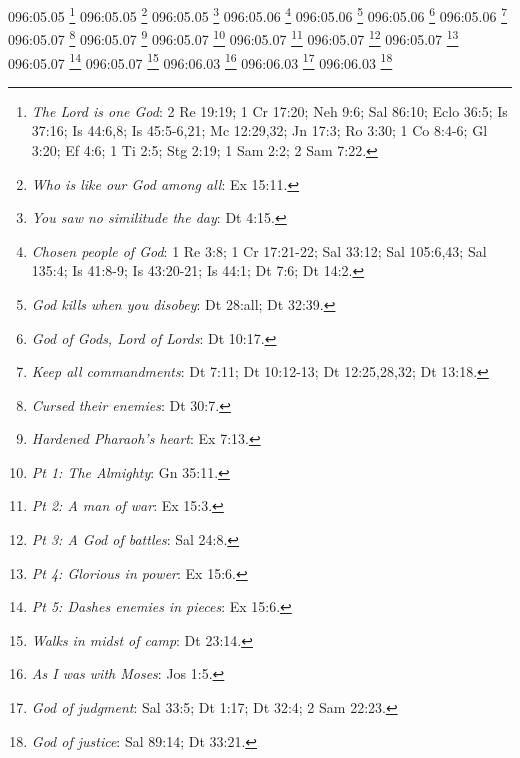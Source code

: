 096:05.05 \footnote{\textit{The Lord is one God}: 2 Re 19:19; 1 Cr 17:20; Neh 9:6; Sal 86:10; Eclo 36:5; Is 37:16; Is 44:6,8; Is 45:5-6,21; Mc 12:29,32; Jn 17:3; Ro 3:30; 1 Co 8:4-6; Gl 3:20; Ef 4:6; 1 Ti 2:5; Stg 2:19; 1 Sam 2:2; 2 Sam 7:22.}
096:05.05 \footnote{\textit{Who is like our God among all}: Ex 15:11.}
096:05.05 \footnote{\textit{You saw no similitude the day}: Dt 4:15.}
096:05.06 \footnote{\textit{Chosen people of God}: 1 Re 3:8; 1 Cr 17:21-22; Sal 33:12; Sal 105:6,43; Sal 135:4; Is 41:8-9; Is 43:20-21; Is 44:1; Dt 7:6; Dt 14:2.}
096:05.06 \footnote{\textit{God kills when you disobey}: Dt 28:all; Dt 32:39.}
096:05.06 \footnote{\textit{God of Gods, Lord of Lords}: Dt 10:17.}
096:05.06 \footnote{\textit{Keep all commandments}: Dt 7:11; Dt 10:12-13; Dt 12:25,28,32; Dt 13:18.}
096:05.07 \footnote{\textit{Cursed their enemies}: Dt 30:7.}
096:05.07 \footnote{\textit{Hardened Pharaoh's heart}: Ex 7:13.}
096:05.07 \footnote{\textit{Pt 1: The Almighty}: Gn 35:11.}
096:05.07 \footnote{\textit{Pt 2: A man of war}: Ex 15:3.}
096:05.07 \footnote{\textit{Pt 3: A God of battles}: Sal 24:8.}
096:05.07 \footnote{\textit{Pt 4: Glorious in power}: Ex 15:6.}
096:05.07 \footnote{\textit{Pt 5: Dashes enemies in pieces}: Ex 15:6.}
096:05.07 \footnote{\textit{Walks in midst of camp}: Dt 23:14.}
096:06.03 \footnote{\textit{As I was with Moses}: Jos 1:5.}
096:06.03 \footnote{\textit{God of judgment}: Sal 33:5; Dt 1:17; Dt 32:4; 2 Sam 22:23.}
096:06.03 \footnote{\textit{God of justice}: Sal 89:14; Dt 33:21.}
